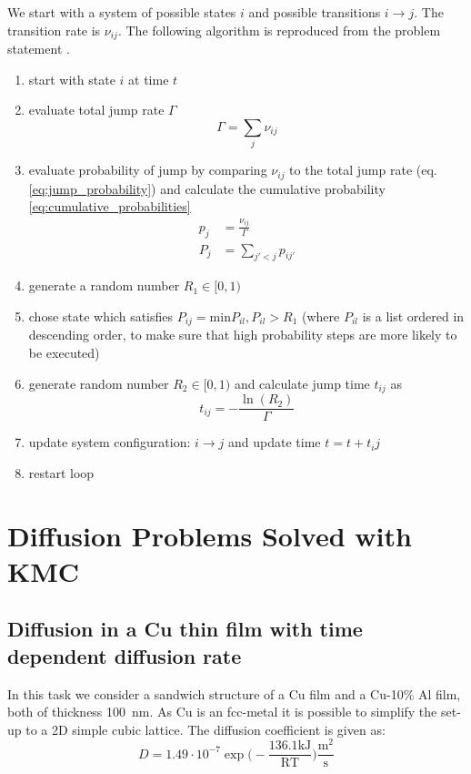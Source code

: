 We start with a system of possible states \(i\) and possible transitions \(i \rightarrow j\). The transition rate is \(\nu_{ij}\). The following algorithm is reproduced from the problem statement \cite{zaiserb}.

\begin{enumerate}
	\item start with state \(i\) at time \(t\)
	\item evaluate total jump rate $\Gamma$ \begin{equation}
		\Gamma = \sum\limits_{j}\nu_{ij} \label{eq:total_jump_rate}
	\end{equation} 
	\item evaluate probability of jump by comparing \( \nu_{ij} \) to the total jump rate (eq. \ref{eq:jump_probability}) and calculate the cumulative probability \ref{eq:cumulative_probabilities} 
	\begin{subequations}
		\begin{align}
			p_{j} & = \frac{\nu_{ij}}{\Gamma} \label{eq:jump_probability} \\
			 P_{j }&= \sum\limits_{j'<j}p_{ij'} \label{eq:cumulative_probabilities}
		\end{align}
	\end{subequations} 
	\item generate a random number \(R_{1} \in [0,1)\)
	\item chose state which satisfies \( P_{ij} = \mathrm{min}{P_{il}, P_{il} > R_{1}}\) (where \(P_{il}\) is a list ordered in descending order, to make sure that high probability steps are more likely to be executed)
	\item generate random number \(R_{2} \in [0,1)\) and calculate jump time \(t_{ij}\) as
	\begin{equation}
		t_{ij} = - \frac{\ln(R_{2})}{\Gamma}
	\end{equation}
	\item update system configuration: \(i \rightarrow j\) and update time \(t = t + t_ij\)
	\item restart loop

\end{enumerate} 

\section{Diffusion Problems Solved with KMC}
\subsection{Diffusion in a Cu thin film with time dependent diffusion rate}
In this task we consider a sandwich structure of a Cu film and a Cu-10\% Al film, both of thickness 100~nm. As Cu is an fcc-metal it is possible to simplify the set-up to a 2D simple cubic lattice. The diffusion coefficient is given as:
\begin{equation}
	D = 1.49 \cdot 10^{-7} \exp \bigl( - \frac{136.1 \mathrm{kJ}}{\mathrm{R T}}   \bigr) \frac{\mathrm{m}^{2}}{\mathrm{s}}
\end{equation}


